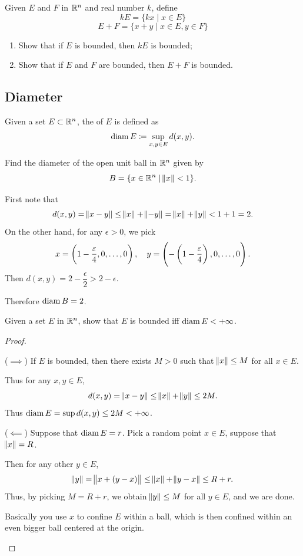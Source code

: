 \begin{exercise}
Given $E$ and $F$ in $\mathbb R^n$ and real number $k$, define
\[ kE=\{kx \mid x\in E\} \]
\[ E+F=\{x+y \mid x\in E,y\in F\} \]
\begin{enumerate}[label=(\alph*)]
\item Show that if $E$ is bounded, then $kE$ is bounded;
\item Show that if $E$ and $F$ are bounded, then $E+F$ is bounded.
\end{enumerate}
\end{exercise}

\subsection{Diameter}
\begin{definition}
Given a set $E\subset\mathbb R^n$, the  of $E$ is defined as
\[ \operatorname{diam} E\coloneqq\sup_{x,y\in E}d(x,y). \]
\end{definition}

\begin{exercise}
Find the diameter of the open unit ball in $\mathbb R^n$ given by
\[ B=\{x\in\mathbb R^n \mid \norm{x}<1\}. \]
\end{exercise}
\begin{solution}
First note that
\[ d(x,y)=\norm{x-y}\le\norm{x}+\norm{-y}=\norm{x}+\norm{y}<1+1=2. \]
On the other hand, for any $\epsilon>0$, we pick
\[ x=\left(1-\frac{\varepsilon}{4},0,\dots,0\right), \quad y=\left(-\left(1-\frac{\varepsilon}{4}\right),0,\dots,0\right). \]
Then $d(x,y)=2-\dfrac{\epsilon}{2}>2-\epsilon$.

Therefore $\operatorname{diam} B = 2$.
\end{solution}

\begin{exercise}
Given a set $E$ in $\mathbb R^n$, show that $E$ is bounded iff $\operatorname{diam} E<+\infty$.
\end{exercise}
\begin{proof} \

($\implies$) If $E$ is bounded, then there exists $M>0$ such that $\norm{x}\le M$ for all $x \in E$.

Thus for any $x,y \in E$,
\[ d(x,y)=\norm{x-y}\le\norm{x}+\norm{y}\le2M. \]
Thus $\operatorname{diam} E = \sup d(x,y) \le 2M<+\infty$.

($\impliedby$) Suppose that $\operatorname{diam} E=r$. Pick a random point $x \in E$, suppose that $\norm{x}=R$.

Then for any other $y \in E$,
\[ \norm{y}=\norm{x+(y-x)}\le\norm{x}+\norm{y-x}\le R+r. \]
Thus, by picking $M=R+r$, we obtain $\norm{y}\le M$ for all $y \in E$, and we are done.

\begin{remark}
Basically you use $x$ to confine $E$ within a ball, which is then confined within an even bigger ball centered at the origin.
\end{remark}
\end{proof}

